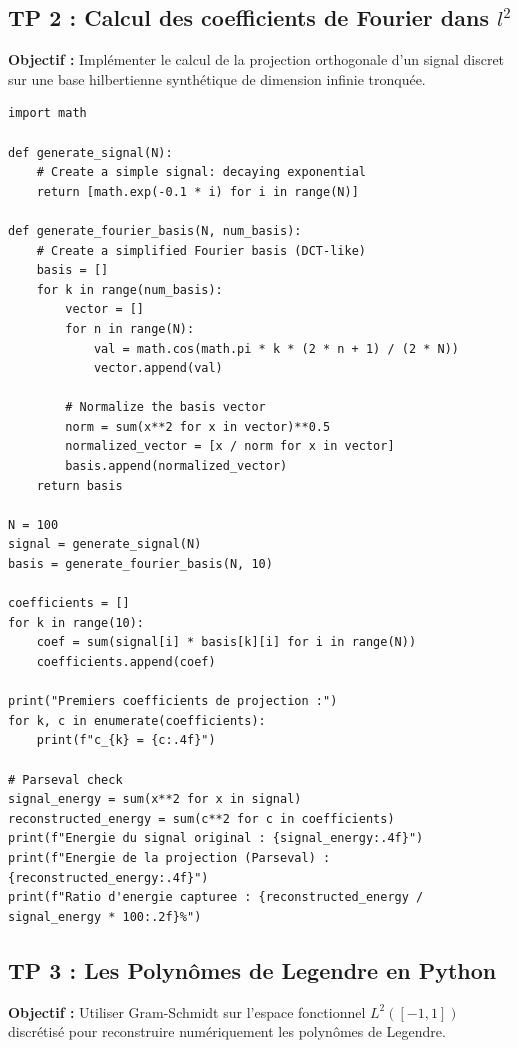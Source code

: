 \documentclass[11pt,a4paper]{article}
\begin{document}
\subsection*{TP 2 : Calcul des coefficients de Fourier dans $l^2$}

\textbf{Objectif :} Implémenter le calcul de la projection orthogonale d'un signal discret sur une base hilbertienne synthétique de dimension infinie tronquée.

\begin{lstlisting}
import math

def generate_signal(N):
    # Create a simple signal: decaying exponential
    return [math.exp(-0.1 * i) for i in range(N)]

def generate_fourier_basis(N, num_basis):
    # Create a simplified Fourier basis (DCT-like)
    basis = []
    for k in range(num_basis):
        vector = []
        for n in range(N):
            val = math.cos(math.pi * k * (2 * n + 1) / (2 * N))
            vector.append(val)

        # Normalize the basis vector
        norm = sum(x**2 for x in vector)**0.5
        normalized_vector = [x / norm for x in vector]
        basis.append(normalized_vector)
    return basis

N = 100
signal = generate_signal(N)
basis = generate_fourier_basis(N, 10)

coefficients = []
for k in range(10):
    coef = sum(signal[i] * basis[k][i] for i in range(N))
    coefficients.append(coef)

print("Premiers coefficients de projection :")
for k, c in enumerate(coefficients):
    print(f"c_{k} = {c:.4f}")

# Parseval check
signal_energy = sum(x**2 for x in signal)
reconstructed_energy = sum(c**2 for c in coefficients)
print(f"Energie du signal original : {signal_energy:.4f}")
print(f"Energie de la projection (Parseval) : {reconstructed_energy:.4f}")
print(f"Ratio d'energie capturee : {reconstructed_energy / signal_energy * 100:.2f}%")
\end{lstlisting}


\subsection*{TP 3 : Les Polynômes de Legendre en Python}

\textbf{Objectif :} Utiliser Gram-Schmidt sur l'espace fonctionnel $L^2([-1, 1])$ discrétisé pour reconstruire numériquement les polynômes de Legendre.
\end{document}
